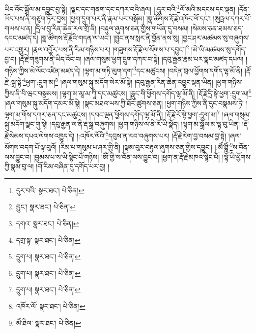 ཡིད་འོང་སྒྲོལ་མ་དབྱུང་བྱ་སྟེ། །ལྗང་དང་གནག་དང་དཀར་བའི་ཞལ། །:དཱུར་བའི་\footnote{དུར་བའི་  སྣར་ཐང་།  པེ་ཅིན། }ལོ་མའི་མདངས་དང་ལྡན། །དོན་ཡོད་པས་ནི་གཙུག་ཏོར་བྱས། །ཕྱག་དྲུག་པར་ནི་རྣམ་པར་བསྒོམ། །སྣ་ཚོགས་རྡོ་རྗེ་འཁོར་ལོ་དང་། །ཨུཏྤལ་དཀར་པོ་གཡས་པ་ན། །དྲིལ་བུ་རིན་ཆེན་རལ་གྲི་ནི། །བརྟུལ་ཞུགས་ཅན་གྱིས་གཡོན་དུ་བསམ། །སེམས་ཅན་ཐམས་ཅད་དབང་མཛད་དེ། །སྣ་ཚོགས་རྡོ་རྗེའི་གདན་ལ་ཡང་། །བྱུང་ནས་སླར་ནི་བྱོན་ནས་སུ། །བྱང་ཤར་མཚམས་སུ་བཞུགས་པར་འགྱུར། །རྣལ་འབྱོར་པས་ནི་རིམ་གཉིས་པར། །གཟུགས་རྡོ་རྗེ་ལ་སོགས་པ་དབྱུང་།\footnote{བྱུང་།  སྣར་ཐང་།  པེ་ཅིན། } །མེ་ཡི་མཚམས་སུ་དགོད་བྱ་བ། །རྡོ་རྗེ་གཟུགས་ནི་ཡིད་འོང་བ། །ཞལ་གསུམ་ཕྱག་དྲུག་དཀར་བ་སྟེ། །དབུ་རྒྱན་རྣམ་པར་སྣང་མཛད་དཔལ། །གཉིས་ཀྱིས་མེ་ལོང་འཛིན་མཛད་དེ། །ལྷག་མ་གཏི་མུག་དག་\footnote{དགའ་  སྣར་ཐང་།  པེ་ཅིན། }དང་མཚུངས། །བདེན་བྲལ་ཕྱོགས་དགོད་ལྷ་མོ་ནི། །རྡོ་རྗེ་:སྒྲ་སྟེ་\footnote{དགྲ་སྟ་  སྣར་ཐང་།  པེ་ཅིན། }ཕྱག་:དྲུག་མ།\footnote{དྲུག་པ།  སྣར་ཐང་།  པེ་ཅིན། } །ཞལ་གསུམ་སྐུ་མདོག་སེར་མོ་སྟེ། །དབུ་རྒྱན་རིན་ཆེན་འབྱུང་ལྡན་ཡིན། །ཕྱག་གཉིས་ཀྱིས་ནི་བི་ཝང་བསྣམས། །ལྷག་མ་མཱ་མ་ཀཱི་དང་མཚུངས། །རླུང་གི་ཕྱོགས་དགོད་ལྷ་མོ་ནི། །རྡོ་རྗེ་དྲི་སྟེ་ཕྱག་:དྲུག་མ།\footnote{དྲུག་པ།  སྣར་ཐང་།  པེ་ཅིན། } །ཞལ་གསུམ་སྐུ་མདོག་དམར་མོ་སྟེ། །སྣང་མཐའ་ཡས་ཀྱི་ཐོར་ཚུགས་ཅན། །ཕྱག་གཉིས་ཀྱིས་ནི་དུང་བསྣམས་ཏེ། །ལྷག་མ་གོས་དཀར་ཅན་དང་མཚུངས། །དབང་ལྡན་ཕྱོགས་དགོད་ལྷ་མོ་ནི། །རྡོ་རྗེ་རོ་སྟེ་ཕྱག་:དྲུག་མ།\footnote{དྲུག་པ།  སྣར་ཐང་།  པེ་ཅིན། } །ཞལ་གསུམ་སྐུ་མདོག་ལྗང་གུ་སྟེ། །དབུ་རྒྱན་ལ་ནི་རྡ་སྒྲ་བཞུགས། །ཕྱག་གཉིས་ལ་ནི་རོ་ཡི་སྣོད། །ལྷག་མ་སྒྲོལ་མ་ལྟ་བུ་ཡིན། །རྡོ་རྗེ་སེམས་དཔའ་ལེགས་འཁྱུད་དེ། །:འཁོར་ལོའི་\footnote{འཁོར་ལོ་  སྣར་ཐང་།  པེ་ཅིན། }དབུས་ན་རབ་བཞུགས་པར། །རྡོ་རྗེ་རེག་བྱ་བསམ་བྱ་སྟེ། །ཞལ་སོགས་བདག་པོ་ལྟ་བུའོ། །རིམ་པ་གསུམ་པ་ཤར་གྱི་ནི། །སྣམ་བུར་བརྟུལ་ཞུགས་ཅན་གྱིས་དབྱུང་། །:མཻཾ་ཐླིཾ་\footnote{མེཾ་ཐིལ་  སྣར་ཐང་།  པེ་ཅིན། }ས་བོན་ལས་བྱུང་བ། །བྱམས་པ་ས་ཡི་སྙིང་པོ་གཉིས། །ཨོཾ་གྱི་ས་བོན་ལས་བྱུང་བ། །ཕྱག་ན་རྡོ་རྗེ་མཁའ་སྙིང་པོ། །ལྷོ་ཡི་ཕྱོགས་ཀྱི་སྣམ་བུ་ལ། །གོ་རིམ་བཞིན་དུ་དགོད་པར་བྱ། །
